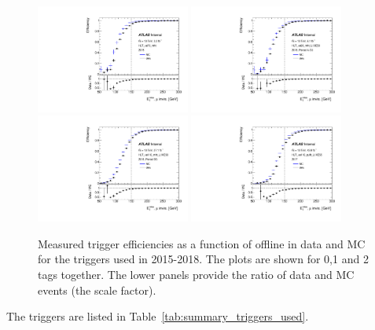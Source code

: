 \begin{figure}[h]
	\centering
	\includegraphics[width=0.45\textwidth]{fig/METTriggerCalibration/efficiecy_HLT_xe70_mht.pdf}
	\includegraphics[width=0.45\textwidth]{fig/METTriggerCalibration/efficiecy_HLT_xe90_mht_L1XE50.pdf}
	\includegraphics[width=0.45\textwidth]{fig/METTriggerCalibration/efficiecy_HLT_xe110_mht_L1XE50.pdf}
	\includegraphics[width=0.45\textwidth]{fig/METTriggerCalibration/efficiecy_HLT_xe110_pufit_L1XE55.pdf}
	\caption{Measured trigger efficiencies as a function of offline \METnomu in data and MC for the \met triggers used in 2015-2018. The plots are shown for 0,1 and 2 tags together. The lower panels provide the ratio of data and MC events (the scale factor).}
	\label{fig:TrigEff}
\end{figure}
The triggers are listed in Table~\ref{tab:summary_triggers_used}. 

